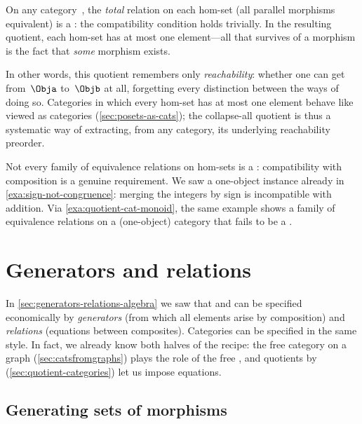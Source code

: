 \begin{example}
    \label{exa:quotient-cat-collapse}
    On any category~\CatC, the \emph{total} relation on each hom-set (all parallel morphisms equivalent) is a : the compatibility condition holds trivially.
    In the resulting quotient, each hom-set has at most one element---all that survives of a morphism is the fact that \emph{some} morphism exists.

    In other words, this quotient remembers only \emph{reachability}: whether one can get from~$\Obja$ to~$\Objb$ at all, forgetting every distinction between the ways of doing so.
    Categories in which every hom-set has at most one element behave like  viewed as categories (\cref{sec:posets-as-cats}); the collapse-all quotient is thus a systematic way of extracting, from any category, its underlying reachability preorder.
\end{example}

\begin{remark}
    Not every family of equivalence relations on hom-sets is a : compatibility with composition is a genuine requirement.
    We saw a one-object instance already in \cref{exa:sign-not-congruence}: merging the integers by sign is incompatible with addition.
    Via \cref{exa:quotient-cat-monoid}, the same example shows a family of equivalence relations on a (one-object) category that fails to be a .
\end{remark}

\section{Generators and relations}
\label{sec:cat-generators-relations}


In \cref{sec:generators-relations-algebra} we saw that  and  can be specified economically by \emph{generators} (from which all elements arise by composition) and \emph{relations} (equations between composites).
Categories can be specified in the same style.
In fact, we already know both halves of the recipe: the free category on a graph (\cref{sec:catsfromgraphs}) plays the role of the free , and quotients by  (\cref{sec:quotient-categories}) let us impose equations.

\subsection{Generating sets of morphisms}

